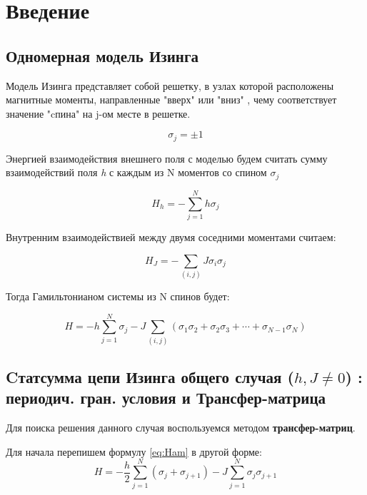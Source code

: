 \section{Введение}

\subsection{Одномерная модель Изинга}

Модель Изинга представляет собой решетку, в узлах которой расположены магнитные моменты, направленные "вверх"  или "вниз" , чему соответствует значение "cпина" на j-ом месте в решетке.

\[ \sigma_{j} = \pm1 \]

Энергией взаимодействия внешнего поля с моделью будем считать сумму взаимодействий поля \textit{h} с каждым из N моментов со спином $\sigma_{j}$

\begin{equation}\label{Hh}
  H_{h} = - \sum_{j = 1}^{N} h  \sigma_{j}   
\end{equation}

Внутренним взаимодействией между двумя соседними моментами считаем:

\begin{equation}\label{Hj}
  H_{J} = - \sum_{(i,j)} J  \sigma_{i}  \sigma_{j}
\end{equation}

Тогда Гамильтонианом системы из N спинов будет:

\begin{equation}\label{eq:Ham} 
   H = - h\sum_{j = 1}^{N}  \sigma_{j} - J \sum_{(i,j)} (\sigma_{1} \sigma_{2} + \sigma_{2} \sigma_{3} + \cdots + \sigma_{N-1} \sigma_{N})
\end{equation}

\subsection{Cтатсумма цепи Изинга общего случая ($h, J \neq 0 $) : периодич. гран. условия и Трансфер-матрица}

Для поиска решения данного случая воспользуемся методом \textbf{трансфер-матриц}.

Для начала перепишем формулу \eqref{eq:Ham} в другой форме:
\begin{equation}\label{eq:HamTrM}
    H = - \frac{h}{2}\sum_{j = 1}^{N}  (\sigma_{j} + \sigma_{j+1}) - J \sum_{j = 1}^{N} \sigma_{j}  \sigma_{j+1} 
\end{equation}

